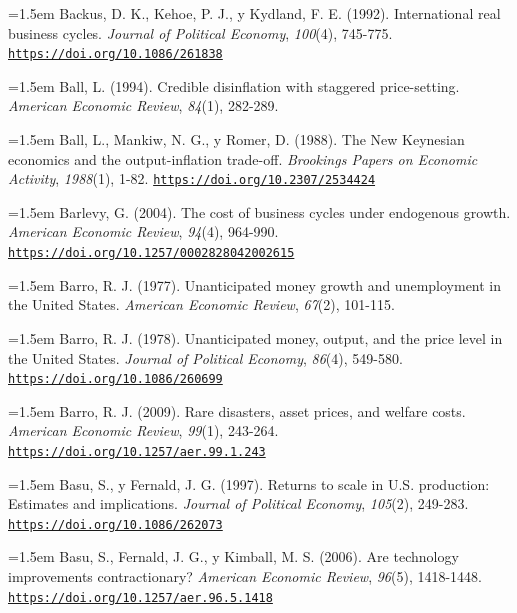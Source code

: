 \documentclass[10pt,a4paper]{article}
\begin{document}
\noindent\hangindent=1.5em Backus, D. K., Kehoe, P. J., y Kydland, F. E. (1992). International real business cycles. \textit{Journal of Political Economy}, \textit{100}(4), 745-775. \href{https://doi.org/10.1086/261838}{\nolinkurl{https://doi.org/10.1086/261838}}

\noindent\hangindent=1.5em Ball, L. (1994). Credible disinflation with staggered price-setting. \textit{American Economic Review}, \textit{84}(1), 282-289.

\noindent\hangindent=1.5em Ball, L., Mankiw, N. G., y Romer, D. (1988). The New Keynesian economics and the output-inflation trade-off. \textit{Brookings Papers on Economic Activity}, \textit{1988}(1), 1-82. \href{https://doi.org/10.2307/2534424}{\nolinkurl{https://doi.org/10.2307/2534424}}

\noindent\hangindent=1.5em Barlevy, G. (2004). The cost of business cycles under endogenous growth. \textit{American Economic Review}, \textit{94}(4), 964-990. \href{https://doi.org/10.1257/0002828042002615}{\nolinkurl{https://doi.org/10.1257/0002828042002615}}

\noindent\hangindent=1.5em Barro, R. J. (1977). Unanticipated money growth and unemployment in the United States. \textit{American Economic Review}, \textit{67}(2), 101-115.

\noindent\hangindent=1.5em Barro, R. J. (1978). Unanticipated money, output, and the price level in the United States. \textit{Journal of Political Economy}, \textit{86}(4), 549-580. \href{https://doi.org/10.1086/260699}{\nolinkurl{https://doi.org/10.1086/260699}}

\noindent\hangindent=1.5em Barro, R. J. (2009). Rare disasters, asset prices, and welfare costs. \textit{American Economic Review}, \textit{99}(1), 243-264. \href{https://doi.org/10.1257/aer.99.1.243}{\nolinkurl{https://doi.org/10.1257/aer.99.1.243}}

\noindent\hangindent=1.5em Basu, S., y Fernald, J. G. (1997). Returns to scale in U.S. production: Estimates and implications. \textit{Journal of Political Economy}, \textit{105}(2), 249-283. \href{https://doi.org/10.1086/262073}{\nolinkurl{https://doi.org/10.1086/262073}}

\noindent\hangindent=1.5em Basu, S., Fernald, J. G., y Kimball, M. S. (2006). Are technology improvements contractionary? \textit{American Economic Review}, \textit{96}(5), 1418-1448. \href{https://doi.org/10.1257/aer.96.5.1418}{\nolinkurl{https://doi.org/10.1257/aer.96.5.1418}}
\end{document}
